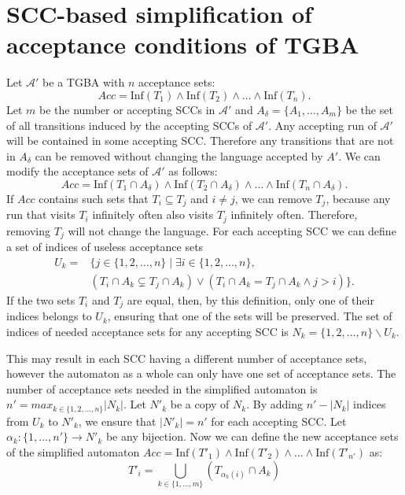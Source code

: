 \documentclass[
  digital, %
  twoside, %
  table,   %
  lof,     %
  lot,     %
]{fithesis3}
\begin{document}
\chapter{SCC-based simplification of acceptance conditions of TGBA} 
\label{chap:tgba_simpl}
Let $\mathcal{A'}$ be a TGBA with $n$ acceptance sets: 
\begin{equation*}
  Acc = \text{Inf}(T_1) \wedge \text{Inf}(T_2) \wedge \dots \wedge \text{Inf}(T_n).
\end{equation*}
Let $m$ be the number or accepting SCCs in $\mathcal{A'}$ and $A_\delta = \{A_1, \dots, A_m\}$ be the set of all transitions induced by the accepting SCCs of $\mathcal{A'}$. 
Any accepting run of $\mathcal{A'}$ will be contained in some accepting SCC. Therefore any transitions that are not in $A_\delta$ can be removed without changing the language accepted by $A'$. We can modify the acceptance sets of $\mathcal{A'}$ as follows: 
\begin{equation*}
  Acc = \text{Inf}(T_1 \cap A_\delta) \wedge \text{Inf}(T_2 \cap A_\delta) \wedge \dots \wedge \text{Inf}(T_n \cap A_\delta).
\end{equation*}
If $Acc$ contains such sets that $T_i \subseteq T_j$ and $i \neq j$, we can remove $T_j$, because any run that visits $T_i$ infinitely often also visits $T_j$ infinitely often. Therefore, removing $T_j$ will not change the language.
For each accepting SCC we can define a set of indices of useless acceptance sets 
\begin{equation*}
  \begin{aligned}
    U_k = &\{ j \in \{1, 2, \dots, n\} \mid \exists i \in \{1, 2, \dots, n\}, \\
    &(T_i \cap A_k \subsetneq T_j \cap A_k) \vee (T_i \cap A_k = T_j \cap A_k \wedge j > i)\}.
  \end{aligned}
\end{equation*}
If the two sets $T_i$ and $T_j$ are equal, then, by this definition, only one of their indices belongs to $U_k$, ensuring that one of the sets will be preserved. The set of indices of needed acceptance sets for any accepting SCC is $N_k = \{1, 2, \dots, n\} \smallsetminus U_k$. 

This may result in each SCC having a different number of acceptance sets, however the automaton as a whole can only have one set of acceptance sets. The number of acceptance sets needed in the simplified automaton is $n' = max_{k \in \{1, 2, \dots, n\}} |N_k|$. Let $N'_k$ be a copy of $N_k$. By adding $n' - |N_k|$ indices from $U_k$ to $N'_k$, we ensure that $|N'_k| = n'$ for each accepting SCC. Let $\alpha_k \colon \{1, \dots, n'\} \to N'_k$ be any bijection. Now we can define the new acceptance sets of the simplified automaton $Acc = \text{Inf}(T'_1) \wedge \text{Inf}(T'_2) \wedge \dots \wedge \text{Inf}(T'_{n'})$ as:
\begin{equation*}
  T'_i = \underset{k \in \{1, \dots, m\}}\bigcup (T_{\alpha_k(i)} \cap A_k)
\end{equation*}
\end{document}
